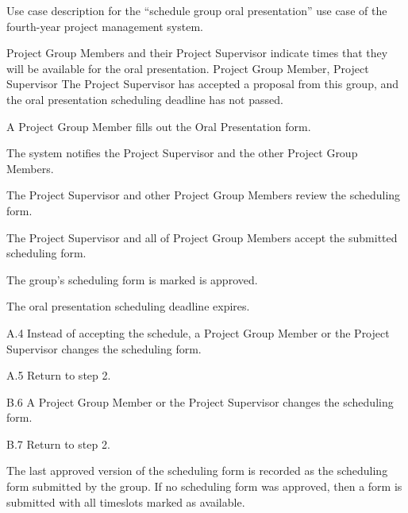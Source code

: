 \documentclass[document.tex]{subfiles}
\begin{document}
\begin{table}
  \centering
  \caption{Use case description for the ``schedule group oral presentation'' use case of the fourth-year project management system.}
  \label{tbl:use-case-schedule-group-oral}

  \begin{usecase}
    Project Group Members and their Project Supervisor indicate times that they will be available for the oral presentation.
    Project Group Member, Project Supervisor
    The Project Supervisor has accepted a proposal from this group, and the oral presentation scheduling deadline has not passed.
    \ucnormal
    \begin{ucenum}
      \item A Project Group Member fills out the Oral Presentation form.
      \item The system notifies the Project Supervisor and the other Project Group Members.
      \item The Project Supervisor and other Project Group Members review the scheduling form.
      \item The Project Supervisor and all of Project Group Members accept the submitted scheduling form.
      \item The group’s scheduling form is marked is approved.
      \item The oral presentation scheduling deadline expires.
    \end{ucenum}
    \begin{ucenum*}
      \item [A.4] Instead of accepting the schedule, a Project Group Member or the Project Supervisor changes the scheduling form.
      \item [A.5] Return to step 2.
    \end{ucenum*}
    \begin{ucenum}
      \item [B.6] A Project Group Member or the Project Supervisor changes the scheduling form.
      \item [B.7] Return to step 2.
    \end{ucenum}
    The last approved version of the scheduling form is recorded as the scheduling form submitted by the group. If no scheduling form was approved, then a form is submitted with all timeslots marked as available.
  \end{usecase}
\end{table}
\end{document}
